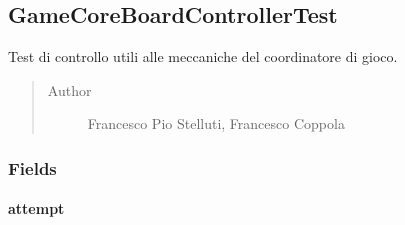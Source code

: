 \documentclass[letterpaper,10pt,italian]{sphinxmanual}
\begin{document}
\label{\detokenize{test/it/unicam/cs/pa/mastermind/test/package-index:package-it.unicam.cs.pa.mastermind.test}}

\subsection{GameCoreBoardControllerTest}
\label{\detokenize{test/it/unicam/cs/pa/mastermind/test/GameCoreBoardControllerTest:gamecoreboardcontrollertest}}\label{\detokenize{test/it/unicam/cs/pa/mastermind/test/GameCoreBoardControllerTest::doc}}

\begin{fulllineitems}
\label{\detokenize{test/it/unicam/cs/pa/mastermind/test/GameCoreBoardControllerTest:it.unicam.cs.pa.mastermind.test.GameCoreBoardControllerTest}}
Test di controllo utili alle meccaniche del coordinatore di gioco.
\begin{quote}\begin{description}
\item[{Author}] \leavevmode
Francesco Pio Stelluti, Francesco Coppola

\end{description}\end{quote}

\end{fulllineitems}



\subsubsection{Fields}
\label{\detokenize{test/it/unicam/cs/pa/mastermind/test/GameCoreBoardControllerTest:fields}}

\paragraph{attempt}
\label{\detokenize{test/it/unicam/cs/pa/mastermind/test/GameCoreBoardControllerTest:attempt}}

\begin{fulllineitems}
\label{\detokenize{test/it/unicam/cs/pa/mastermind/test/GameCoreBoardControllerTest:it.unicam.cs.pa.mastermind.test.GameCoreBoardControllerTest.attempt}}
\end{fulllineitems}
\end{document}
